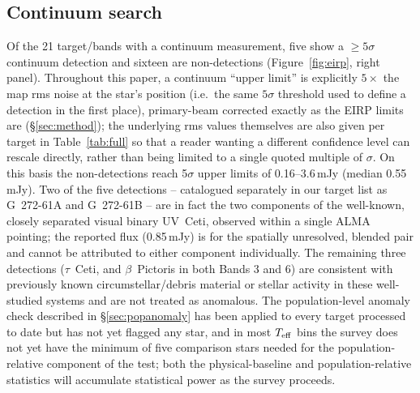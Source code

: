 \documentclass{openjournal}
\begin{document}
\subsection{Continuum search}

Of the 21 target/bands with a continuum measurement, five show a
$\geq5\sigma$ continuum detection and sixteen are non-detections
(Figure~\ref{fig:eirp}, right panel). Throughout this paper, a continuum
``upper limit'' is explicitly $5\times$ the map rms noise at the star's
position (i.e.\ the same $5\sigma$ threshold used to define a detection
in the first place), primary-beam corrected exactly as the EIRP limits
are (\S\ref{sec:method}); the underlying rms values themselves are also
given per target in Table~\ref{tab:full} so that a reader wanting a
different confidence level can rescale directly, rather than being
limited to a single quoted multiple of $\sigma$. On this basis the
non-detections reach 5$\sigma$ upper limits of 0.16--3.6\,mJy (median
0.55\,mJy). Two of the five detections -- catalogued separately in our
target list as G~272-61A and G~272-61B -- are in fact the two components
of the well-known, closely separated visual binary UV~Ceti, observed
within a single ALMA pointing; the reported flux (0.85\,mJy) is for the
spatially unresolved, blended pair and cannot be attributed to either
component individually. The remaining three detections ($\tau$~Ceti, and
$\beta$~Pictoris in both Bands 3 and 6) are consistent with previously
known circumstellar/debris material or stellar activity in these
well-studied systems and are not treated as anomalous. The population-level anomaly check described in
\S\ref{sec:popanomaly} has been applied to every target processed to
date but has not yet flagged any star, and in most $T_{\rm eff}$ bins the
survey does not yet have the minimum of five comparison stars needed for
the population-relative component of the test; both the physical-baseline
and population-relative statistics will accumulate statistical power as
the survey proceeds.
\end{document}
